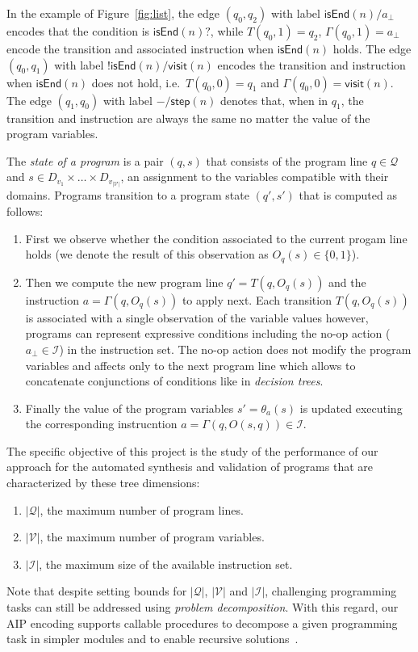 \documentclass[10pt,a4paper]{paper}
\begin{document}
In the example of Figure~\ref{fig:list}, the edge $(q_0,q_2)$ with label $\mathsf{isEnd}(n)/a_\bot$ encodes that the condition is $\mathsf{isEnd}(n)?$, while $T(q_0,1)=q_2$, $\Gamma(q_0,1)=a_\bot$ encode the transition and associated instruction when $\mathsf{isEnd}(n)$ holds. The edge $(q_0,q_1)$ with label $!\mathsf{isEnd}(n)/\mathsf{visit}(n)$ encodes the transition and instruction when $\mathsf{isEnd}(n)$ does not hold, i.e.~$T(q_0,0)=q_1$ and $\Gamma(q_0,0)=\mathsf{visit}(n)$. The edge $(q_1,q_0)$ with label $-/\mathsf{step}(n)$ denotes that, when in $q_1$, the transition and instruction are always the same no matter the value of the program variables.

The {\em state of a program} is a pair $(q,s)$ that consists of the program line $q\in \mathcal{Q}$ and $s\in D_{v_1}\times \ldots \times D_{v_{|\mathcal{V}|}}$, an assignment to the variables compatible with their domains. Programs transition to a program state $(q',s')$ that is computed as follows:
\begin{enumerate}
\item First we observe whether the condition associated to the current progam line holds (we denote the result of this observation as $O_q(s)\in \{0,1\}$). 
\item Then we compute the new program line $q'=T(q,O_q(s))$ and the instruction $a=\Gamma(q,O_q(s))$ to apply next. Each transition $T(q,O_q(s))$ is associated with a single observation of the variable values however, programs can represent expressive conditions including the no-op action ($a_{\bot}\in\mathcal{I}$) in the instruction set. The no-op action does not modify the program variables and affects only to the next program line which allows to concatenate conjunctions of conditions like in {\em decision trees}.
\item Finally the value of the program variables $s'=\theta_a(s)$ is updated executing the corresponding instrucntion $a=\Gamma(q,O(s,q))\in \mathcal{I}$.
\end{enumerate}
 
The specific objective of this project is the study of the performance of our approach for the automated synthesis and validation of programs that are characterized by these tree dimensions:
\begin{enumerate}
\item $|\mathcal{Q}|$, the maximum number of program lines.
\item $|\mathcal{V}|$, the maximum number of program variables. 
\item $|\mathcal{I}|$, the maximum size of the available instruction set.  
\end{enumerate}
Note that despite setting bounds for $|\mathcal{Q}|$, $|\mathcal{V}|$ and $|\mathcal{I}|$, challenging programming tasks can still be addressed using {\em problem decomposition}. With this regard, our AIP encoding supports callable procedures to decompose a given programming task in simpler modules and to enable recursive solutions~\cite{sergio:aprograming:icaps16,sergio:aprograming:ijcai16}.
\end{document}
